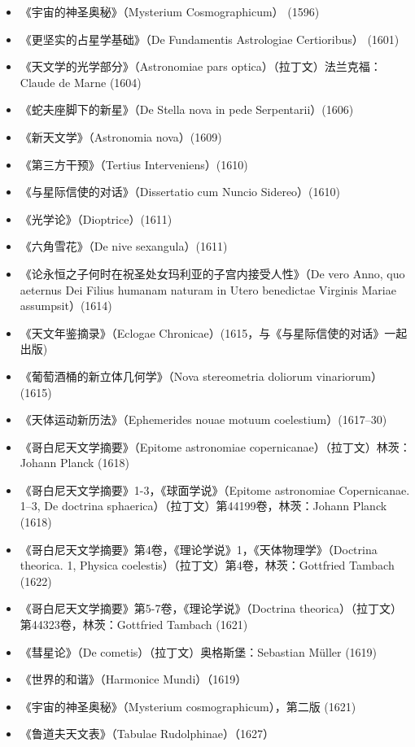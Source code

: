 \begin{itemize}
\item 《宇宙的神圣奥秘》（Mysterium Cosmographicum） (1596)
\item 《更坚实的占星学基础》（De Fundamentis Astrologiae Certioribus） (1601)
\item 《天文学的光学部分》（Astronomiae pars optica）（拉丁文）法兰克福：Claude de Marne (1604)
\item 《蛇夫座脚下的新星》（De Stella nova in pede Serpentarii）(1606)
\item 《新天文学》（Astronomia nova）(1609)
\item 《第三方干预》（Tertius Interveniens）(1610)
\item 《与星际信使的对话》（Dissertatio cum Nuncio Sidereo）(1610)
\item 《光学论》（Dioptrice）(1611)
\item 《六角雪花》（De nive sexangula）(1611)
\item 《论永恒之子何时在祝圣处女玛利亚的子宫内接受人性》（De vero Anno, quo aeternus Dei Filius humanam naturam in Utero benedictae Virginis Mariae assumpsit）(1614)
\item 《天文年鉴摘录》（Eclogae Chronicae）(1615，与《与星际信使的对话》一起出版)
\item 《葡萄酒桶的新立体几何学》（Nova stereometria doliorum vinariorum）(1615)
\item 《天体运动新历法》（Ephemerides nouae motuum coelestium）(1617–30)
\item 《哥白尼天文学摘要》（Epitome astronomiae copernicanae）（拉丁文）林茨：Johann Planck (1618)
\item 《哥白尼天文学摘要》1-3，《球面学说》（Epitome astronomiae Copernicanae. 1–3, De doctrina sphaerica）（拉丁文）第44199卷，林茨：Johann Planck (1618)
\item 《哥白尼天文学摘要》第4卷，《理论学说》1，《天体物理学》（Doctrina theorica. 1, Physica coelestis）（拉丁文）第4卷，林茨：Gottfried Tambach (1622)
\item 《哥白尼天文学摘要》第5-7卷，《理论学说》（Doctrina theorica）（拉丁文）第44323卷，林茨：Gottfried Tambach (1621)
\item 《彗星论》（De cometis）（拉丁文）奥格斯堡：Sebastian Müller (1619)
\item 《世界的和谐》（Harmonice Mundi）（1619）
\item 《宇宙的神圣奥秘》（Mysterium cosmographicum），第二版 (1621)
\item 《鲁道夫天文表》（Tabulae Rudolphinae）（1627）

\end{itemize}
